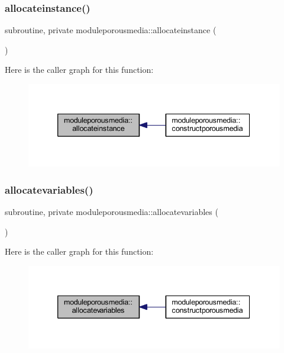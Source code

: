 \subsubsection{\texorpdfstring{allocateinstance()}{allocateinstance()}}
{\footnotesize\ttfamily subroutine, private moduleporousmedia\+::allocateinstance (\begin{DoxyParamCaption}{ }\end{DoxyParamCaption})\hspace{0.3cm}{\ttfamily [private]}}

Here is the caller graph for this function\+:\nopagebreak
\begin{figure}[H]
\begin{center}
\leavevmode
\includegraphics[width=339pt]{namespacemoduleporousmedia_a52ed3f752ac2299db63f80ea0dca19d2_icgraph}
\end{center}
\end{figure}
\mbox{\label{namespacemoduleporousmedia_a908fc394580adaa43494724ec7882eca}} 
\subsubsection{\texorpdfstring{allocatevariables()}{allocatevariables()}}
{\footnotesize\ttfamily subroutine, private moduleporousmedia\+::allocatevariables (\begin{DoxyParamCaption}{ }\end{DoxyParamCaption})\hspace{0.3cm}{\ttfamily [private]}}

Here is the caller graph for this function\+:\nopagebreak
\begin{figure}[H]
\begin{center}
\leavevmode
\includegraphics[width=339pt]{namespacemoduleporousmedia_a908fc394580adaa43494724ec7882eca_icgraph}
\end{center}
\end{figure}
\mbox{\label{namespacemoduleporousmedia_a6c8a46ce1fd00d13bf974507ac525cb8}} 
